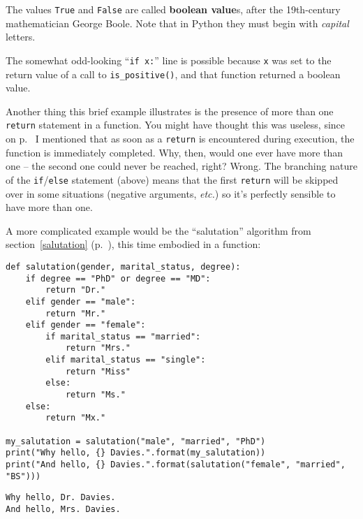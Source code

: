 The values \texttt{True} and \texttt{False} are called \textbf{boolean value}s,
after the 19th-century mathematician George Boole. Note that in Python they
must begin with \textit{capital} letters.

The somewhat odd-looking ``\texttt{if x:}'' line is possible because \texttt{x}
was set to the return value of a call to \texttt{is\_positive()}, and that
function returned a boolean value.

Another thing this brief example illustrates is the presence of more than one
\texttt{return} statement in a function. You might have thought this was
useless, since on p.~\pageref{returnImmediatelyReturns} I mentioned that as
soon as a \texttt{return} is encountered during execution, the function is
immediately completed. Why, then, would one ever have more than one -- the
second one could never be reached, right? Wrong. The branching nature of the
\texttt{if}/\texttt{else} statement (above) means that the first
\texttt{return} will be skipped over in some situations (negative arguments,
\textit{etc.}) so it's perfectly sensible to have more than one.

A more complicated example would be the ``salutation'' algorithm from
section~\ref{salutation} (p.~\pageref{salutation}), this time embodied in a
function:

\begin{Verbatim}[fontsize=\small,samepage=true,frame=single,framesep=3mm]
def salutation(gender, marital_status, degree):
    if degree == "PhD" or degree == "MD":
        return "Dr."
    elif gender == "male":
        return "Mr."
    elif gender == "female":
        if marital_status == "married":
            return "Mrs."
        elif marital_status == "single":
            return "Miss"
        else:
            return "Ms."
    else:
        return "Mx."

my_salutation = salutation("male", "married", "PhD")
print("Why hello, {} Davies.".format(my_salutation))
print("And hello, {} Davies.".format(salutation("female", "married", "BS")))
\end{Verbatim}
\vspace{-.2in}

\begin{Verbatim}[fontsize=\small,samepage=true,frame=leftline,framesep=5mm,framerule=1mm]
Why hello, Dr. Davies.
And hello, Mrs. Davies.
\end{Verbatim}

